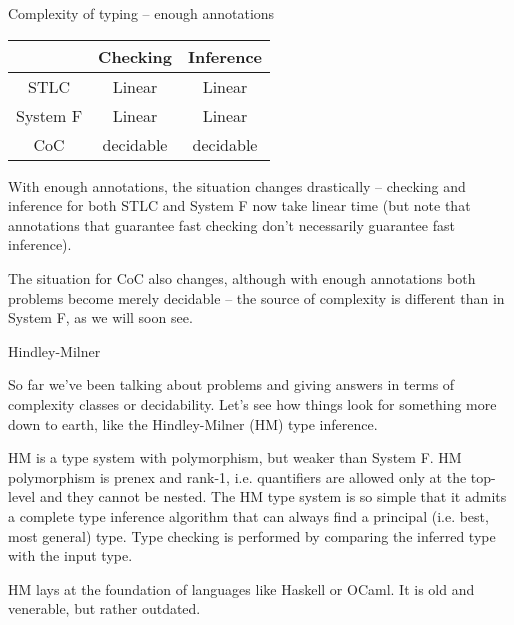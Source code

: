 \documentclass{beamer}
\begin{document}
\begin{frame}{Complexity of typing -- enough annotations}

\vspace{1em}

\begin{table}
  \centering
  \begin{tabular}{|c|c|c|}
    \hline
             & Checking  & Inference \\ \hline
    STLC     & Linear    & Linear    \\ \hline
    System F & Linear    & Linear    \\ \hline
    CoC      & decidable & decidable \\ \hline
  \end{tabular}
\end{table}

\vspace{1em}

With enough annotations, the situation changes drastically -- checking and inference for both STLC and System F now take linear time (but note that annotations that guarantee fast checking don't necessarily guarantee fast inference).

\vspace{1em}

The situation for CoC also changes, although with enough annotations both problems become merely decidable -- the source of complexity is different than in System F, as we will soon see.

\end{frame}

\begin{frame}{Hindley-Milner}

So far we've been talking about problems and giving answers in terms of complexity classes or decidability. Let's see how things look for something more down to earth, like the Hindley-Milner (HM) type inference.

\vspace{1em}

HM is a type system with polymorphism, but weaker than System F. HM polymorphism is prenex and rank-1, i.e. quantifiers are allowed only at the top-level and they cannot be nested. The HM type system is so simple that it admits a complete type inference algorithm that can always find a principal (i.e. best, most general) type. Type checking is performed by comparing the inferred type with the input type.

\vspace{1em}

HM lays at the foundation of languages like Haskell or OCaml. It is old and venerable, but rather outdated.

\end{frame}
\end{document}
